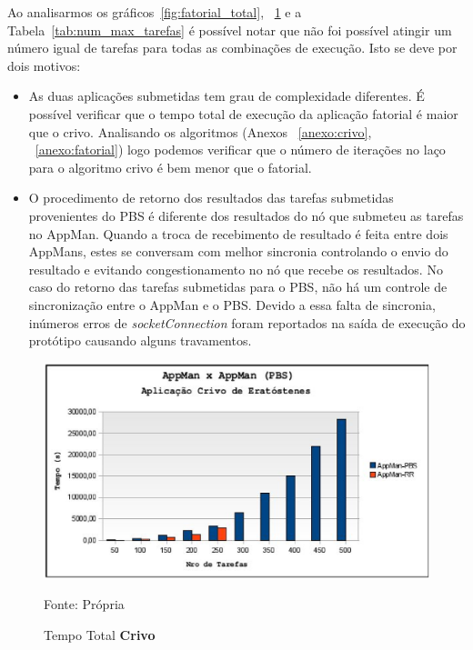 Ao analisarmos os gráficos~\ref{fig:fatorial_total}, ~\ref{fig:crivo_total} e a Tabela~\ref{tab:num_max_tarefas} é possível notar que não foi possível atingir um número igual de tarefas para todas as combinações de execução. Isto se deve por dois motivos:

\begin{itemize}
	\item As duas aplicações submetidas tem grau de complexidade diferentes.
		É possível verificar que o tempo total de execução da aplicação fatorial é maior que o crivo. Analisando os algoritmos (Anexos ~\ref{anexo:crivo}, ~\ref{anexo:fatorial}) logo podemos verificar que o número de iterações no laço para o algoritmo crivo é bem menor que o fatorial.
	\item O procedimento de retorno dos resultados das tarefas submetidas provenientes do PBS é diferente dos resultados do nó que submeteu as tarefas no AppMan. Quando a troca de recebimento de resultado é feita entre dois AppMans, estes se conversam com melhor sincronia controlando o envio do resultado e evitando congestionamento no nó que recebe os resultados. No caso do retorno das tarefas submetidas para o PBS, não há um controle de sincronização entre o AppMan e o PBS. Devido a essa falta de sincronia, inúmeros erros de \emph{socketConnection} foram reportados na saída de execução do protótipo causando alguns travamentos.
\end{itemize}

\begin{figure}[htb]
\begin{center}
\includegraphics[scale=0.7]{./img/MapaCrivoTempoTotal.ps}
\caption{Tempo Total \textbf{Crivo}}
\label{fig:crivo_total}
Fonte: Própria
\end{center}
\end{figure}
	
